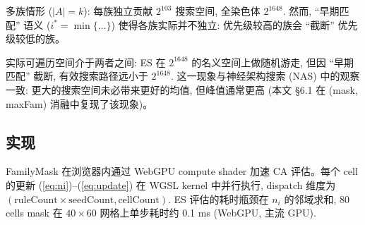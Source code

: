 多族情形 ($|A| = k$): 每族独立贡献 $2^{103}$ 搜索空间, 全染色体 $2^{1648}$. 然而, ``早期匹配'' 语义 ($i^* = \min\{\ldots\}$) 使得各族实际并不独立: 优先级较高的族会 ``截断'' 优先级较低的族。

实际可遍历空间介于两者之间: ES 在 $2^{1648}$ 的名义空间上做随机游走, 但因 ``早期匹配'' 截断, 有效搜索路径远小于 $2^{1648}$. 这一现象与神经架构搜索 (NAS) 中的观察一致: 更大的搜索空间未必带来更好的均值, 但峰值通常更高 (本文 §6.1 在 (mask, maxFam) 消融中复现了该现象)。

\subsection{实现}

FamilyMask 在浏览器内通过 WebGPU compute shader 加速 CA 评估。每个 cell 的更新 (\ref{eq:ni})--(\ref{eq:update}) 在 WGSL kernel 中并行执行, dispatch 维度为 $(\text{ruleCount} \times \text{seedCount}, \text{cellCount})$. ES 评估的耗时瓶颈在 $n_i$ 的邻域求和, 80 cells mask 在 $40 \times 60$ 网格上单步耗时约 0.1 ms (WebGPU, 主流 GPU).
